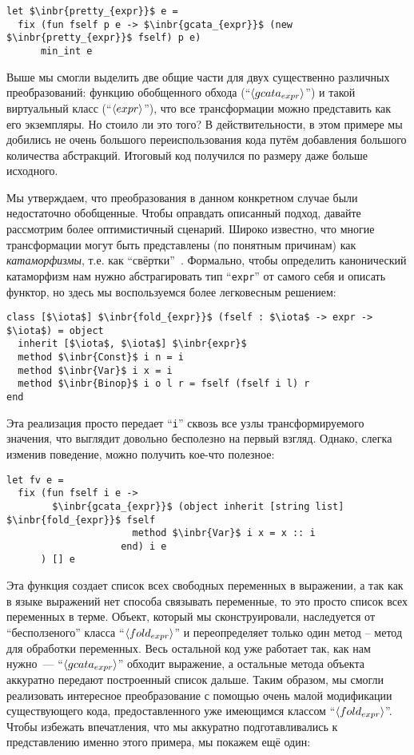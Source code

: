 \begin{lstlisting}
let $\inbr{pretty_{expr}}$ e =
  fix (fun fself p e -> $\inbr{gcata_{expr}}$ (new $\inbr{pretty_{expr}}$ fself) p e)
      min_int e
\end{lstlisting}

Выше мы смогли выделить две общие части для двух существенно различных преобразований: функцию обобщенного обхода
(``$\left<gcata_{expr}\right>$'') и такой виртуальный класс (``$\left<expr\right>$''), что все трансформации можно представить как его экземпляры.
Но стоило ли это того? В действительности, в этом примере мы добились не очень большого переиспользования кода путём добавления
большого количества абстракций. Итоговый код получился по размеру даже больше исходного.

Мы утверждаем, что преобразования в данном конкретном случае были недостаточно обобщенные. Чтобы оправдать описанный подход,
давайте рассмотрим более оптимистичный сценарий. Широко известно, что многие трансформации могут быть представлены 
(по понятным причинам) как \emph{катаморфизмы}, т.е. как ``свёртки''~\cite{Fold,Bananas,CalculatingFP}. 
Формально, чтобы определить канонический катаморфизм нам нужно абстрагировать тип ``\lstinline{expr}'' 
от самого себя и описать функтор, но здесь мы воспользуемся более легковесным решением:

\begin{lstlisting}
class [$\iota$] $\inbr{fold_{expr}}$ (fself : $\iota$ -> expr -> $\iota$) = object 
  inherit [$\iota$, $\iota$] $\inbr{expr}$ 
  method $\inbr{Const}$ i n = i
  method $\inbr{Var}$ i x = i
  method $\inbr{Binop}$ i o l r = fself (fself i l) r
end
\end{lstlisting}

Эта реализация просто передает ``\lstinline{i}'' сквозь все узлы трансформируемого значения, что выглядит довольно бесполезно на первый взгляд.
Однако, слегка изменив поведение, можно получить кое-что полезное:

\begin{lstlisting}
let fv e =
  fix (fun fself i e ->
        $\inbr{gcata_{expr}}$ (object inherit [string list] $\inbr{fold_{expr}}$ fself
                      method $\inbr{Var}$ i x = x :: i
                    end) i e
      ) [] e
\end{lstlisting}

Эта функция создает список всех свободных переменных в выражении, а так как в языке выражений нет способа связывать переменные, 
то это просто список всех переменных в терме. Объект, который мы сконструировали, наследуется от ``бесползеного'' класса ``$\left<fold_{expr}\right>$'' и переопределяет только один метод -- метод для обработки переменных.
Весь остальной код уже работает так, как нам нужно~--- ``$\left<gcata_{expr}\right>$'' обходит выражение, 
а остальные метода объекта аккуратно передают построенный список дальше.
Таким образом, мы смогли реализовать интересное преобразование с помощью очень малой модификации существующего кода, 
предоставленного уже имеющимся классом ``$\left<fold_{expr}\right>$''. Чтобы избежать впечатления, что мы аккуратно подготавливались к
представлению именно этого примера, мы покажем ещё один:

